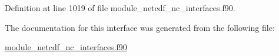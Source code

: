Definition at line 1019 of file module\+\_\+netcdf\+\_\+nc\+\_\+interfaces.\+f90.



The documentation for this interface was generated from the following file\+:\begin{DoxyCompactItemize}
\item 
\hyperlink{module__netcdf__nc__interfaces_8f90}{module\+\_\+netcdf\+\_\+nc\+\_\+interfaces.\+f90}\end{DoxyCompactItemize}
